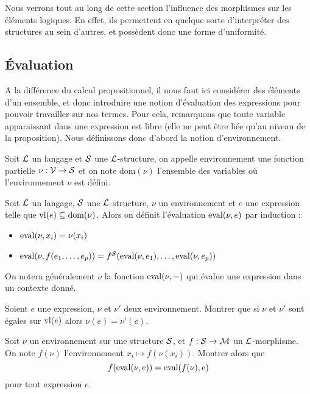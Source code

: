 \begin{rmk}
    Nous verrons tout au long de cette section l'influence des morphismes sur les éléments logiques. En effet, ils permettent en quelque sorte d'interpréter des structures au sein d'autres, et possèdent donc une forme \og d'uniformité\fg{}.
\end{rmk}

\subsection{\'Evaluation}

A la différence du calcul propositionnel, il nous faut ici considérer des éléments d'un ensemble, et donc introduire une notion d'évaluation des expressions pour pouvoir travailler sur nos termes. Pour cela, remarquons que toute variable apparaissant dans une expression est libre (elle ne peut être liée qu'au niveau de la proposition). Nous définissons donc d'abord la notion d'environnement.

\begin{defi}[Environnement]
    Soit $\mathcal L$ un langage et $\mathcal S$ une $\mathcal L$-structure, on appelle environnement une fonction partielle $\nu : \mathcal V \to \mathcal S$ et on note $\mathrm{dom}(\nu)$ l'ensemble des variables où l'environnement $\nu$ est défini.
\end{defi}

\begin{defi}
    Soit $\mathcal L$ un langage, $\mathcal S$ une $\mathcal L$-structure, $\nu$ un environnement et $e$ une expression telle que $\mathrm{vl}(e)\subseteq \mathrm{dom}(\nu)$. Alors on définit l'évaluation $\mathrm{eval}(\nu,e)$ par induction :
    \begin{itemize}[label=$\bullet$]
        \item $\mathrm{eval}(\nu,x_i) = \nu(x_i)$
        \item $\mathrm{eval}(\nu,f(e_1,\ldots,e_p)) = f^\mathcal S(\mathrm{eval}(\nu,e_1),\ldots,\mathrm{eval}(\nu,e_p))$
    \end{itemize}

    On notera généralement $\nu$ la fonction $\mathrm{eval}(\nu,-)$ qui évalue une expression dans un contexte donné.
\end{defi}

\begin{exo}
    Soient $e$ une expression, $\nu$ et $\nu'$ deux environnement. Montrer que si $\nu$ et $\nu'$ sont égales sur $\mathrm{vl}(e)$ alors $\nu(e)=\nu'(e)$.
\end{exo}

\begin{exo}\label{exo:morph}
    Soit $\nu$ un environnement sur une structure $\mathcal S$, et $f : \mathcal S\to\mathcal M$ un $\mathcal L$-morphisme. On note $f(\nu)$ l'environnement $x_i\mapsto f(\nu(x_i))$. Montrer alors que $$f(\mathrm{eval}(\nu,e))=\mathrm{eval}(f(\nu),e)$$ pour tout expression $e$.
\end{exo}

